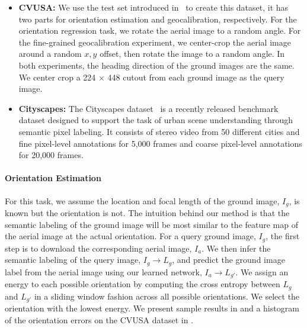 \begin{itemize}

\item{\textbf{CVUSA:}} We use the test set introduced
in~ to create this dataset, it has two parts for
orientation estimation and geocalibration, respectively.  For the
orientation regression task, we rotate the aerial image to a random
angle. For the fine-grained geocalibration experiment, we center-crop
the aerial image around a random $x,y$ offset, then rotate the image to a
random angle.  In both experiments, the heading direction of the
ground images are the same. We center crop a 224 $\times$ 448
cutout from each ground image as the query image.

\item{\textbf{Cityscapes:}}  The Cityscapes dataset~\cite{Cordts2016Cityscapes} 
is a recently released benchmark dataset designed to support the task
of urban scene understanding through semantic pixel labeling. It
consists of stereo video from 50 different cities and fine pixel-level
annotations for 5,000 frames and coarse pixel-level annotations for
20,000 frames. 

\end{itemize}

\paragraph{Orientation Estimation}

For this task, we assume the location and focal length of the ground
image, $I_g$, is known but the orientation is not. The intuition
behind our method is that the semantic labeling of the ground image
will be most similar to the feature map of the aerial image at the
actual orientation.  For a query ground image, $I_g$, the first step
is to download the corresponding aerial image, $I_a$.  We then infer
the semantic labeling of the query image, $I_g \rightarrow L_g$, and
predict the ground image label from the aerial image using our learned
network, $I_a \rightarrow L_{g'}$.  We assign an energy to each
possible orientation by computing the cross entropy between $L_g$ and
$L_{g'}$ in a sliding window fashion across all possible orientations.
We select the orientation with the lowest energy.  We present sample results in 
 and a histogram of the orientation errors on the 
CVUSA dataset in .





